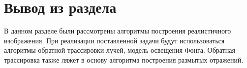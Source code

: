 
\section{Вывод из раздела}

В данном разделе были рассмотрены алгоритмы построения реалистичного изображения. При реализации поставленной задачи будут использоваться алгоритмы обратной трассировки лучей, модель освещения Фонга. Обратная трассировка также ляжет в основу алгоритма построения размытых отражений.